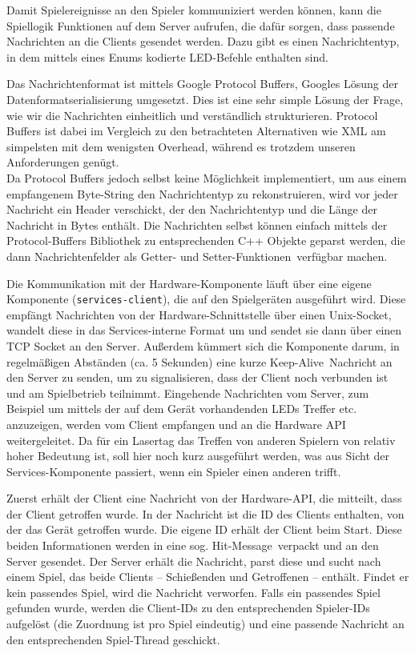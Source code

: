 Damit Spielereignisse an den Spieler kommuniziert werden können, kann die Spiellogik Funktionen auf dem Server aufrufen, die dafür sorgen, dass passende Nachrichten an die Clients gesendet werden. Dazu gibt es einen Nachrichtentyp, in dem mittels eines Enums kodierte LED-Befehle enthalten sind. 

Das Nachrichtenformat ist mittels Google Protocol Buffers, Googles Lösung der Datenformatserialisierung umgesetzt. Dies ist eine sehr simple Lösung der Frage, wie wir die Nachrichten einheitlich und verständlich strukturieren. Protocol Buffers ist dabei im Vergleich zu den betrachteten Alternativen wie XML am simpelsten mit dem wenigsten Overhead, während es trotzdem unseren Anforderungen genügt.\\
 Da Protocol Buffers jedoch selbst keine Möglichkeit
implementiert, um aus einem empfangenem Byte-String den Nachrichtentyp zu rekonstruieren, wird vor jeder Nachricht
ein Header verschickt, der den Nachrichtentyp und die Länge der Nachricht in Bytes enthält.
Die Nachrichten selbst können einfach mittels der Protocol-Buffers Bibliothek zu entsprechenden C++ Objekte geparst werden, die dann Nachrichtenfelder als \glqq Getter- und Setter-Funktionen\grqq \, verfügbar machen.

Die Kommunikation mit der Hardware-Komponente läuft über eine eigene Komponente (\texttt{services-client}), die auf den Spielgeräten ausgeführt wird. Diese empfängt Nachrichten von der Hardware-Schnittstelle über einen Unix-Socket, wandelt diese in das Services-interne Format um und sendet sie dann über einen TCP Socket an den Server. Außerdem kümmert sich die Komponente darum, in regelmäßigen Abständen (ca. 5 Sekunden) eine kurze \glqq Keep-Alive\grqq \, Nachricht an den Server zu senden, um zu signalisieren, dass der Client noch verbunden ist und am Spielbetrieb teilnimmt. 
Eingehende Nachrichten vom Server, zum Beispiel um mittels der auf dem Gerät vorhandenden LEDs Treffer etc. anzuzeigen, werden vom Client empfangen und an die Hardware API weitergeleitet.\newline \newline
Da für ein Lasertag das Treffen von anderen Spielern von relativ hoher Bedeutung ist, soll hier noch kurz ausgeführt werden, was aus Sicht der Services-Komponente passiert, wenn ein Spieler einen anderen trifft.

Zuerst erhält der Client eine Nachricht von der Hardware-API, die mitteilt, dass der Client getroffen wurde. In der Nachricht ist die ID des Clients enthalten, von der das Gerät getroffen wurde. Die eigene ID erhält der Client beim Start. Diese beiden Informationen werden in eine sog. \glqq Hit-Message\grqq \, verpackt und an den Server gesendet. 
Der Server erhält die Nachricht, parst diese und sucht nach einem Spiel, das beide Clients – Schießenden und Getroffenen – enthält. Findet er kein passendes Spiel, wird die Nachricht verworfen. Falls ein passendes Spiel gefunden wurde, werden die Client-IDs zu den entsprechenden Spieler-IDs aufgelöst (die Zuordnung ist pro Spiel eindeutig) und eine passende Nachricht an den entsprechenden Spiel-Thread geschickt.


